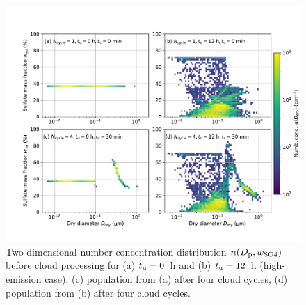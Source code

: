 \documentclass[edeposit,fullpage]{uiucthesis2009}
\begin{document}
\begin{figure}
    \centering
    \includegraphics[scale=0.45]{chap3_figs/fig7.pdf}
    \caption{Two-dimensional number concentration distribution
      $n(D_{\rm p}, w_{\rm SO4})$ before cloud processing for (a)
      $t_{\rm u} = 0$~h and (b) $t_{\rm u} = 12$~h
      (high-emission case), (c) population from (a) after four
      cloud cycles, (d) population from (b) after four cloud cycles.}
    \label{fig:su_2d}
\end{figure}
\end{document}
